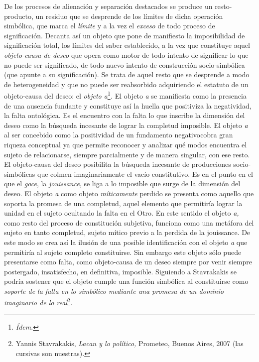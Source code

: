 De los procesos de alienación y separación destacados se produce un resto-producto, un residuo que se desprende de los límites de dicha operación simbólica, que marca el \emph{límite} y a la vez el \emph{exceso} de todo proceso de significación. Decanta así un objeto que pone de manifiesto la imposibilidad de significación total, los límites del saber establecido, a la vez que constituye aquel \emph{objeto-causa de deseo} que opera como motor de todo intento de significar lo que no puede ser significado, de todo nuevo intento de construcción socio-simbólica (que apunte a su significación). Se trata de aquel resto que se desprende a modo de heterogeneidad y que no puede ser reabsorbido adquiriendo el estatuto de un objeto-causa del deseo: el \emph{objeto a}\footnote{\emph{Ídem}.}\emph{.} El objeto \emph{a} se manifiesta como la presencia de una ausencia fundante y constituye así la huella que positiviza la negatividad, la falta ontológica. Es el encuentro con la falta lo que inscribe la dimensión del deseo como la búsqueda incesante de lograr la completud imposible. El objeto \emph{a} al ser concebido como la positividad de un fundamento negativocobra gran riqueza conceptual ya que permite reconocer y analizar qué modos encuentra el sujeto de relacionarse, siempre parcialmente y de manera singular, con ese resto. El objeto-causa del deseo posibilita la búsqueda incesante de producciones socio-simbólicas que colmen imaginariamente el vacío constitutivo. Es en el punto en el que el \emph{goce}, la \emph{jouissance}, se liga a lo imposible que surge de la dimensión del deseo. El objeto \emph{a} como objeto \emph{míticamente} perdido se presenta como aquello que soporta la promesa de una completud, aquel elemento que permitiría lograr la unidad en el sujeto ocultando la falta en el Otro. En este sentido el objeto \emph{a,} como resto del proceso de constitución subjetiva, funciona como una metáfora del sujeto en tanto completud, sujeto mítico previo a la perdida de la jouissance. De este modo se crea así la ilusión de una posible identificación con el objeto \emph{a} que permitiría al sujeto completo constituirse. Sin embargo este objeto sólo puede presentarse como falta, como objeto-causa de un deseo siempre por venir siempre postergado, insatisfecho, en definitiva, imposible. Siguiendo a Stavrakakis se podría sostener que el objeto cumple una función simbólica al constituirse como \emph{soporte de la falta en lo simbólico mediante una promesa de un dominio imaginario de lo real}\footnote{Yannis Stavrakakis, \emph{Lacan y lo político,} Prometeo, Buenos Aires, 2007 (las cursivas son nuestras).}\emph{.}

